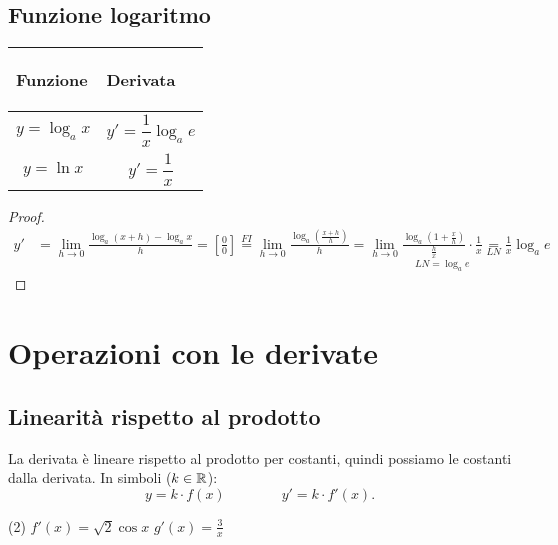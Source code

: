 \subsection{Funzione logaritmo}
\begin{center}
    \begin{tabular}{m{}|m{}}
        \begin{center}
            \textbf{Funzione}
        \end{center}
        & 
        \begin{center}
            \textbf{Derivata}
        \end{center}\\
        \hline
            \[y=\log_a x\]&
            \[y'=\frac{1}{x} \log_a e\] \\
            \[y=\ln x\] & 
            \[y'=\frac{1}{x}\]
    \end{tabular}
\end{center}
\begin{proof}
    \[\begin{aligned}y'&=\lim_{h\to 0}\frac{\log_a(x+h)-\log_a x}{h}=\left[ \frac{0}{0} \right]\overset{FI}{=}\lim_{h\to 0}\frac{\log_a\left(\frac{x+h}{h}\right)}{h}=\lim_{h\to 0}\underset{LN=\log_a e}{\boxed{\frac{\log_a\left(1+\frac{x}{h}\right)}{\frac{h}{x}}}\cdot\frac{1}{x} }\underset{LN}=\frac{1}{x}\log_ae\end{aligned}\]
\end{proof}

\section{Operazioni con le derivate}
    \subsection{Linearità rispetto al prodotto}
    La derivata è lineare rispetto al prodotto per costanti, quindi possiamo  le costanti dalla derivata. In simboli ($k\in\mathbb{R}$):
    \[y=k\cdot f(x)\qquad \qquad y'=k\cdot f'(x).\]
    \begin{ex}[Calcolare la derivata delle seguenti funzioni: 
        \begin{tasks}(2)
            \task $f(x)=\sqrt{2}\sin x$
            \task $g(x)=3\ln x$
        \end{tasks}
        ]
        \begin{tasks}(2)
            \task $f'(x)=\sqrt{2}\cos x$
            \task $g'(x)=\frac{3}{x}$
        \end{tasks}
    \end{ex}
